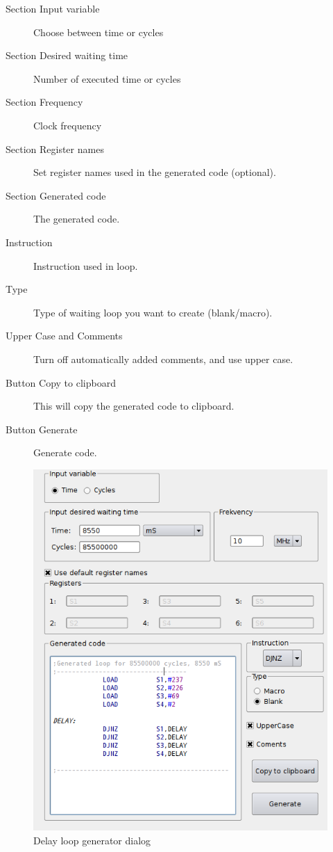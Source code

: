     \begin{description}
        \item[Section Input variable] Choose between time or cycles
        \item[Section Desired waiting time] Number of executed time or cycles
        \item[Section Frequency] Clock frequency
        \item[Section Register names] Set register names used in the generated code (optional).
        \item[Section Generated code] The generated code.
        \item[Instruction] Instruction used in loop.
        \item[Type] Type of waiting loop you want to create (blank/macro).
        \item[Upper Case and Comments]  Turn off automatically added comments, and use upper case.
        \item[Button Copy to clipboard] This will copy the generated code to clipboard.
        \item[Button Generate] Generate code.
    \end{description}

    \begin{figure}[h]
        \centering{}
        \includegraphics[width=.7\textwidth]{img/loop_gen.png}
        \caption{Delay loop generator dialog}
    \end{figure}

